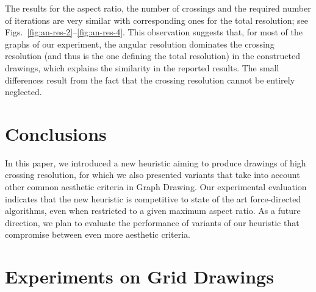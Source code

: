 \documentclass[runningheads]{llncs}
\begin{document}
The results for the aspect ratio, the number of crossings and the required number of iterations are very similar with corresponding ones for the total resolution; see Figs.~\ref{fig:an-res-2}--\ref{fig:an-res-4}. This observation suggests that, for most of the graphs of our experiment, the angular resolution dominates the crossing resolution (and thus is the one defining the total resolution) in the constructed drawings, which explains the similarity in the reported results. The small differences result from the fact that the crossing resolution cannot be entirely neglected.

\section{Conclusions}
\label{sec:conclusions}

In this paper, we introduced a new heuristic aiming to produce drawings of high crossing resolution, for which we also presented variants that take into account other common aesthetic criteria in Graph Drawing. Our experimental evaluation indicates that the new heuristic is competitive to state of the art force-directed algorithms, even when restricted to a given maximum aspect ratio. As a future direction, we plan to evaluate the performance of variants of our heuristic that compromise between even more aesthetic criteria.




\newpage
\appendix

\section{Experiments on Grid Drawings}
\end{document}
